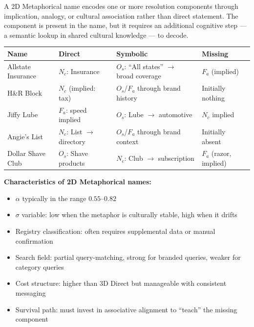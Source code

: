 \documentclass[12pt, openany]{book}
\theoremstyle{thmstyle}
\theoremstyle{defstyle}
\begin{document}
A 2D Metaphorical name encodes one or more resolution components through implication, analogy, or cultural association rather than direct statement. The component is present in the name, but it requires an additional cognitive step --- a semantic lookup in shared cultural knowledge --- to decode.

\begin{examplebox}
\begin{center}
\begin{tabular}{llll}
\toprule
\textbf{Name} & \textbf{Direct} & \textbf{Symbolic} & \textbf{Missing} \\
\midrule
Allstate Insurance & $N_c$: Insurance & $O_s$: ``All states'' $\to$ broad coverage & $F_a$ (implied) \\
H\&R Block & $N_c$ (implied: tax) & $O_s$/$F_a$ through brand history & Initially nothing \\
Jiffy Lube & $F_a$: speed implied & $O_s$: Lube $\to$ automotive & $N_c$ implied \\
Angie's List & $N_c$: List $\to$ directory & $O_s$/$F_a$ through brand context & Initially absent \\
Dollar Shave Club & $O_s$: Shave products & $N_c$: Club $\to$ subscription & $F_a$ (razor, implied) \\
\bottomrule
\end{tabular}
\end{center}

\vspace{6pt}
\textbf{Characteristics of 2D Metaphorical names:}
\begin{itemize}[leftmargin=1.5em]
  \item $\alpha$ typically in the range $0.55$--$0.82$
  \item $\sigma$ variable: low when the metaphor is culturally stable, high when it drifts
  \item Registry classification: often requires supplemental data or manual confirmation
  \item Search field: partial query-matching, strong for branded queries, weaker for category queries
  \item Cost structure: higher than 3D Direct but manageable with consistent messaging
  \item Survival path: must invest in associative alignment to ``teach'' the missing component
\end{itemize}
\end{examplebox}
\end{document}
